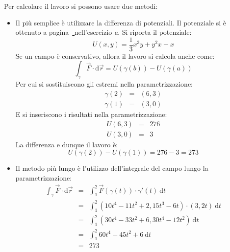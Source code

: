 \documentclass[a4paper]{article}
\begin{document}
	\noindent
	Per calcolare il lavoro si possono usare due metodi:
	\begin{itemize}
		\item Il più semplice è utilizzare la differenza di potenziali. Il potenziale si è ottenuto a pagina~\hyperlink{
			exam: esame 21 giugno 2023 - Gruppo A - 8 esercizio (a)
		}{
		} nell'esercizio \emph{a}. Si riporta il potenziale:
		\begin{equation*}
			U\left(x,y\right) = \dfrac{1}{3}x^{3}y + y^{2}x + x
		\end{equation*}
		Se un campo è conservativo, allora il lavoro si calcola anche come:
		\begin{equation*}
			\displaystyle\int_{\gamma} \overset{\rightarrow}{F} \cdot \mathrm{d}\overset{\rightarrow}{r} 
			= 
			U\left(\gamma\left(b\right)\right) - U\left(\gamma\left(a\right)\right)
		\end{equation*}
		Per cui si sostituiscono gli estremi nella parametrizzazione:
		\begin{equation*}
			\begin{array}{rcl}
				\gamma\left(2\right) &=& \left(6,3\right) \\ [.3em]
				\gamma\left(1\right) &=& \left(3,0\right)
			\end{array}
		\end{equation*}
		E si inseriscono i risultati nella parametrizzazione:
		\begin{equation*}
			\begin{array}{rcl}
				U\left(6,3\right) &=& 276 \\ [.3em]
				U\left(3,0\right) &=& 3
			\end{array}
		\end{equation*}
		La differenza e dunque il lavoro è:
		\begin{equation*}
			U\left(\gamma\left(2\right)\right) - U\left(\gamma\left(1\right)\right) = 276-3 = 273
		\end{equation*}

		\item Il metodo più lungo è l'utilizzo dell'integrale del campo lungo la parametrizzazione:
		\begin{equation*}
			\begin{array}{rcl}
				\displaystyle\int_{\gamma} \overset{\rightarrow}{F} \cdot \mathrm{d}\overset{\rightarrow}{r}
				&=&
				\displaystyle\int_{1}^{2} \overset{\rightarrow}{F}\left(\gamma\left(t\right)\right) \cdot \gamma'\left(t\right) \:\mathrm{d}t \\ [1em]
				&=&
				\displaystyle\int_{1}^{2} \left(10t^{4}-11t^{2}+2, 15t^{3}-6t\right) \cdot \left(3, 2t\right) \:\mathrm{d}t \\ [1em]
				&=&
				\displaystyle\int_{1}^{2} \left(30t^{4}-33t^{2}+6, 30t^{4}-12t^{2}\right) \:\mathrm{d}t \\ [1em]
				&=&
				\displaystyle\int_{1}^{2} 60t^{4}-45t^{2}+6 \:\mathrm{d}t \\ [1.5em]
				&=& 273
			\end{array}
		\end{equation*}
	\end{itemize}
\end{document}
